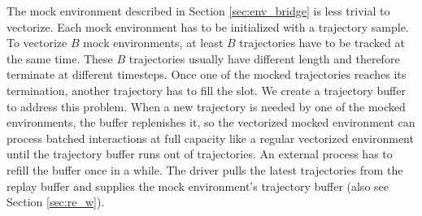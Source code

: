 The mock environment described in Section \ref{sec:env_bridge} is less trivial to vectorize.
Each mock environment has to be initialized with a trajectory sample.
To vectorize $B$ mock environments, at least $B$ trajectories have to be tracked at the same time.
These $B$ trajectories usually have different length and therefore terminate at different timesteps.
Once one of the mocked trajectories reaches its termination, another trajectory has to fill the slot.
We create a trajectory buffer to address this problem.
When a new trajectory is needed by one of the mocked environments, the buffer replenishes it,
so the vectorized mocked environment can process batched interactions at full capacity like a regular vectorized environment until the trajectory buffer runs out of trajectories.
An external process has to refill the buffer once in a while.
The driver pulls the latest trajectories from the replay buffer and supplies the mock environment's trajectory buffer (also see Section \ref{sec:re_w}).


